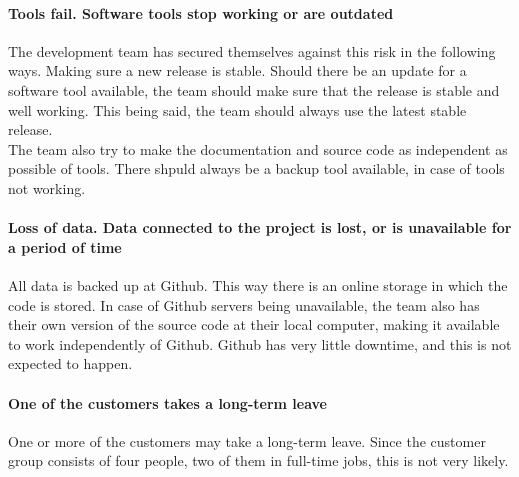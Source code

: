 \paragraph{Tools fail. Software tools stop working or are outdated}
The development team has secured themselves against this risk in the following ways. Making 
sure a new release is stable. Should there be an update for a software tool available, the 
team should make sure that the release is stable and well working. This being said, the team 
should always use the latest stable release. \\
The team also try to make the documentation and source code as independent as possible of tools. 
There shpuld always be a backup tool available, in case of tools not working.

\paragraph{Loss of data. Data connected to the project is lost, or is unavailable for a period of time}
All data is backed up at Github. This way there is an online storage in which the code is stored. 
In case of Github servers being unavailable, the team also has their own version of the source code 
at their local computer, making it available to work independently of Github. Github has very little 
downtime, and this is not expected to happen. 


\paragraph{One of the customers takes a long-term leave}
One or more of the customers may take a long-term leave. Since the customer group consists of four 
people, two of them in full-time jobs, this is not very likely.
